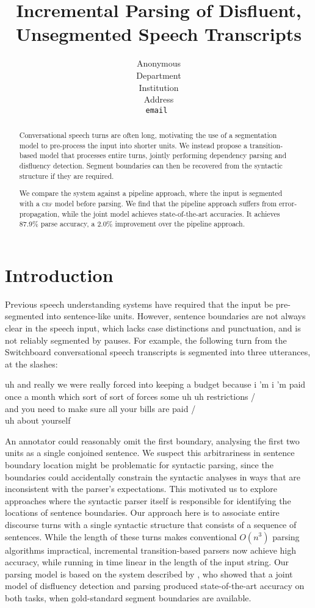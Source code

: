 \documentclass[11pt,letterpaper]{article}
\title{Incremental Parsing of Disfluent, Unsegmented Speech Transcripts}
\author{
	Anonymous\\
  	Department\\
  	Institution\\
  	Address\\
  {\tt \small email }\\
}
\date{}
\begin{document}
\maketitle
\begin{abstract}
Conversational speech turns are often long, motivating the use of a segmentation
model to pre-process the input into shorter units.  We instead propose a
transition-based model that processes entire turns, jointly performing dependency
parsing and disfluency detection.  Segment boundaries can then be recovered
from the syntactic structure if they are required.

We compare the system against a pipeline approach, where the input is segmented
with a \textsc{crf} model before parsing.  We find that the pipeline approach
suffers from error-propagation, while the joint model achieves
state-of-the-art accuracies.
It achieves 87.9\% parse accuracy, a 2.0\% improvement over the pipeline approach.
\end{abstract}

\section{Introduction}


Previous speech understanding systems have required that the input be
pre-segmented into sentence-like units.  However, sentence boundaries are not
always clear in the speech input, which lacks case distinctions and punctuation,
and is not reliably segmented by pauses.
For example, the following turn from the
Switchboard conversational speech transcripts is segmented into three utterances,
at the slashes:

\begin{lexample}
\small
uh and really we were really forced into keeping a budget because i 'm i 'm paid
once a month which sort of sort of forces some uh uh restrictions / \\
and you need to make sure all your bills are paid / \\
uh about yourself
\end{lexample}

\noindent An annotator could reasonably omit the first boundary, analysing
the first two units as a single conjoined sentence.  
We suspect this arbitrariness in sentence boundary location
might be problematic for syntactic parsing, since the boundaries could
accidentally constrain the syntactic analyses in ways that are inconsistent with
the parser's expectations.  This motivated us to explore approaches where the
syntactic parser itself is responsible for identifying the locations of sentence
boundaries.  Our approach here is to associate entire discourse turns with a
single syntactic structure that consists of a sequence of sentences.
While the length of these turns makes conventional $O(n^3)$ parsing algorithms
impractical, incremental transition-based parsers now achieve high accuracy,
while running in time linear in the length of the input string.
Our parsing model is based on the system described
by \citet{honnibal:14}, who showed that a joint model of disfluency detection
and parsing produced state-of-the-art accuracy on both tasks, when gold-standard
segment boundaries are available.
\end{document}
